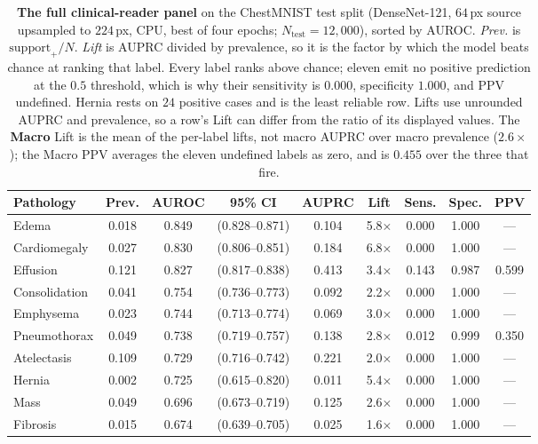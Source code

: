 \documentclass[conference]{IEEEtran}
\begin{document}
\begin{table}[tp]
\centering
\caption{\textbf{The full clinical-reader panel} on the ChestMNIST test split
(DenseNet-121, $64$\,px source upsampled to $224$\,px, CPU, best of four epochs;
$N_{\text{test}}{=}12{,}000$), sorted by AUROC. \emph{Prev.} is
$\text{support}_{+}/N$. \emph{Lift} is AUPRC divided by prevalence, so it is the
factor by which the model beats chance at ranking that label. Every label ranks
above chance; eleven emit no positive prediction at the $0.5$ threshold, which is
why their sensitivity is $0.000$, specificity $1.000$, and PPV undefined. Hernia
rests on $24$ positive cases and is the least reliable row. Lifts use unrounded
AUPRC and prevalence, so a row's Lift can differ from the ratio of its displayed
values. The \textbf{Macro} Lift is the mean of the per-label lifts, not macro AUPRC
over macro prevalence ($2.6\times$); the Macro PPV averages the eleven undefined
labels as zero, and is $0.455$ over the three that fire.}
\label{tab:panel}
\footnotesize
\begin{tabular}{@{}lcccccccc@{}}
\toprule
\textbf{Pathology} & \textbf{Prev.} & \textbf{AUROC} & \textbf{95\% CI} & \textbf{AUPRC} & \textbf{Lift} & \textbf{Sens.} & \textbf{Spec.} & \textbf{PPV} \\
\midrule
Edema              & 0.018 & 0.849 & (0.828--0.871) & 0.104 & 5.8$\times$ & 0.000 & 1.000 & --- \\
Cardiomegaly       & 0.027 & 0.830 & (0.806--0.851) & 0.184 & 6.8$\times$ & 0.000 & 1.000 & --- \\
Effusion           & 0.121 & 0.827 & (0.817--0.838) & 0.413 & 3.4$\times$ & 0.143 & 0.987 & 0.599 \\
Consolidation      & 0.041 & 0.754 & (0.736--0.773) & 0.092 & 2.2$\times$ & 0.000 & 1.000 & --- \\
Emphysema          & 0.023 & 0.744 & (0.713--0.774) & 0.069 & 3.0$\times$ & 0.000 & 1.000 & --- \\
Pneumothorax       & 0.049 & 0.738 & (0.719--0.757) & 0.138 & 2.8$\times$ & 0.012 & 0.999 & 0.350 \\
Atelectasis        & 0.109 & 0.729 & (0.716--0.742) & 0.221 & 2.0$\times$ & 0.000 & 1.000 & --- \\
Hernia             & 0.002 & 0.725 & (0.615--0.820) & 0.011 & 5.4$\times$ & 0.000 & 1.000 & --- \\
Mass               & 0.049 & 0.696 & (0.673--0.719) & 0.125 & 2.6$\times$ & 0.000 & 1.000 & --- \\
Fibrosis           & 0.015 & 0.674 & (0.639--0.705) & 0.025 & 1.6$\times$ & 0.000 & 1.000 & --- \\

\end{tabular}
\end{table}
\end{document}
